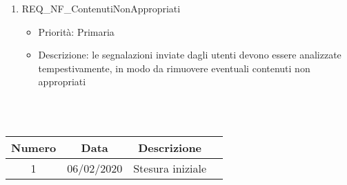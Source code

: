 \begin{enumerate}
	\item REQ\_NF\_ContenutiNonAppropriati
		\begin{itemize}
		\item Priorità: Primaria
		\item Descrizione: le segnalazioni inviate dagli utenti devono essere analizzate tempestivamente, in modo da rimuovere eventuali contenuti non appropriati
		\end{itemize}

\end{enumerate}

 \\ \\
\begin{tabular}{|c | c | c | c|} 
 	\hline
	 Numero & Data & Descrizione \\ [0.5ex] 
	\hline\hline
	1 & 06/02/2020 & Stesura iniziale \\ 
	\hline
\end{tabular}
